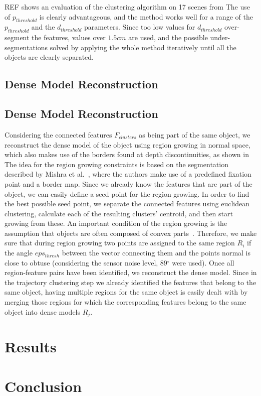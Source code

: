   \label{alg:cluster_trajectories}


REF%
shows an evaluation of the clustering algorithm on 17 scenes from %
 The use of $p_{threshold}$ is clearly advantageous, and the method works well for a range of the $p_{threshold}$ and the $d_{threshold}$ parameters. 
 Since too low values for $d_{threshold}$ over-segment the features, values over $1.5cm$ are used, and the possible under-segmentations solved
 by applying the whole method iteratively until all the objects are clearly separated.
 
 
 
\subsection{Dense Model Reconstruction}

\subsection{Dense Model Reconstruction}
\label{sec:dense_model}

Considering the connected features $F_{clusters}$ as being part of the same object, we reconstruct 
the dense model of the object using region growing in normal space, which also makes use of the 
borders found at depth discontinuities, as shown in %
The idea for the region growing 
constraints is based on the segmentation described by Mishra et al.~\cite{asICCV2009}, 
where the authors make use of a predefined fixation point and a border map. Since we already 
know the features that are part of the object, we can easily define a seed point for the
region growing. In order to find the best possible seed point, we separate the connected 
features using euclidean clustering, calculate each of the resulting clusters' centroid, and 
then start growing from these. An important condition of the region growing is the 
assumption that objects are often composed of convex parts~\cite{Pogor}.
Therefore, we make sure that during region growing two points are assigned to the same region $R_{i}$
if the angle $eps_{thresh}$ between the vector connecting them and the points normal is close to obtuse
(considering the sensor noise level\cite{kinect_accuracy}, 89$^\circ$ were used).
Once all region-feature pairs have been identified, we reconstruct the dense model.
Since in the trajectory clustering step we already identified the features that belong to the same object,
having multiple regions for the same object is easily dealt with
by merging those regions for which the corresponding features belong to the same object into dense models $R_{j}$.

\section{Results}

\section{Conclusion}